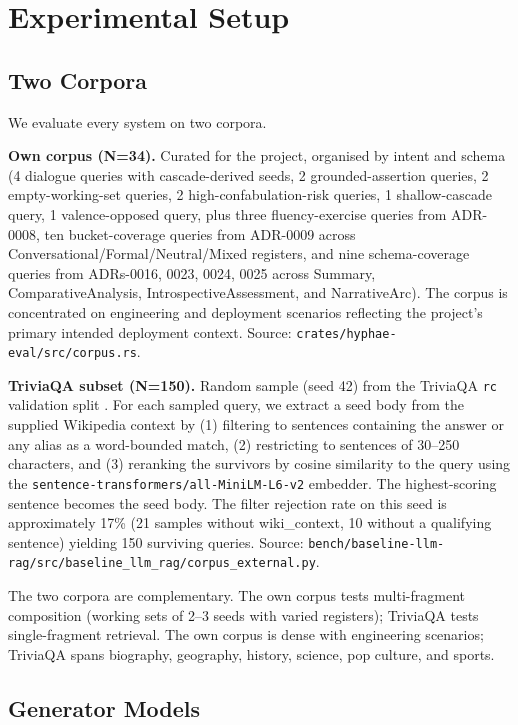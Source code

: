 \section{Experimental Setup}
\label{sec:setup}

\subsection{Two Corpora}
\label{sec:corpora}

We evaluate every system on two corpora.

\textbf{Own corpus (N=34).} Curated for the project, organised by
intent and schema (4 dialogue queries with cascade-derived seeds,
2 grounded-assertion queries, 2 empty-working-set queries, 2
high-confabulation-risk queries, 1 shallow-cascade query, 1
valence-opposed query, plus three fluency-exercise queries from
ADR-0008, ten bucket-coverage queries from ADR-0009 across
Conversational/Formal/Neutral/Mixed registers, and nine
schema-coverage queries from ADRs-0016, 0023, 0024, 0025 across
Summary, ComparativeAnalysis, IntrospectiveAssessment, and
NarrativeArc). The corpus is concentrated on engineering and
deployment scenarios reflecting the project's primary intended
deployment context. Source:
\texttt{crates/hyphae-eval/src/corpus.rs}.

\textbf{TriviaQA subset (N=150).} Random sample (seed 42) from
the TriviaQA \texttt{rc} validation split
\citep{joshi2017triviaqa}. For each sampled query, we extract a
seed body from the supplied Wikipedia context by (1) filtering to
sentences containing the answer or any alias as a word-bounded
match, (2) restricting to sentences of 30--250 characters, and
(3) reranking the survivors by cosine similarity to the query
using the \texttt{sentence-transformers/all-MiniLM-L6-v2}
embedder. The highest-scoring sentence becomes the seed body. The
filter rejection rate on this seed is approximately 17\%
(21 samples without wiki\_context, 10 without a qualifying
sentence) yielding 150 surviving queries. Source:
\texttt{bench/baseline-llm-rag/src/baseline\_llm\_rag/corpus\_external.py}.

The two corpora are complementary. The own corpus tests
multi-fragment composition (working sets of 2--3 seeds with
varied registers); TriviaQA tests single-fragment retrieval. The
own corpus is dense with engineering scenarios; TriviaQA spans
biography, geography, history, science, pop culture, and sports.

\subsection{Generator Models}
\label{sec:generators}

